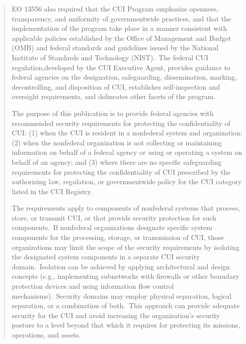 \begin{formal}
\begin{quote}

EO 13556 also required that the CUI Program emphasize openness, transparency, and uniformity of governmentwide practices, and that the implementation of the program take place in a manner consistent with applicable policies established by the Office of Management and Budget (OMB) and federal standards and guidelines issued by the National Institute of Standards and Technology (NIST).\ The federal CUI regulation,developed by the CUI Executive Agent, provides guidance to federal agencies on the designation, safeguarding, dissemination, marking, decontrolling, and disposition of CUI, establishes self-inspection and oversight requirements, and delineates other facets of the program.
\vspace{10pt}

The purpose of this publication is to provide federal agencies with recommended security requirements for protecting the confidentiality of CUI: (1) when the CUI is resident in a nonfederal system and organization; (2) when the nonfederal organization is not collecting or maintaining information on behalf of a federal agency or using or operating a system on behalf of an agency; and (3) where there are no specific safeguarding requirements for protecting the confidentiality of CUI prescribed by the authorizing law, regulation, or governmentwide policy for the CUI category listed in the CUI Registry.
\vspace{10pt}

The requirements apply to components of nonfederal systems that process, store, or transmit CUI, or that provide security protection for such components.\ If nonfederal organizations designate specific system components for the processing, storage, or transmission of CUI, those organizations may limit the scope of the security requirements by isolating the designated system components in a separate CUI security domain.\ Isolation can be achieved by applying architectural and design concepts (e.g., implementing subnetworks with firewalls or other boundary protection devices and using information flow control mechanisms).\ Security domains may employ physical separation, logical separation, or a combination of both.\ This approach can provide adequate security for the CUI and avoid increasing the organization’s security posture to a level beyond that which it requires for protecting its missions, operations, and assets.
\vspace{10pt}


\end{quote}
\end{formal}
